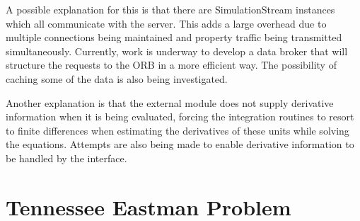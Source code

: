 A possible explanation for this is that there are SimulationStream instances which all communicate with the server.  
This adds a large overhead due to multiple connections being maintained and property traffic being transmitted simultaneously.  
Currently, work is underway to develop a data broker that will structure the requests to the ORB in a more efficient way.  
The possibility of caching some of the data is also being investigated.

Another explanation is that the external module does not supply derivative information when it is being evaluated, forcing the integration routines to resort to finite differences when estimating the derivatives of these units while solving the equations.  
Attempts are also being made to enable derivative information to be handled by the interface.

\section{Tennessee Eastman Problem}


